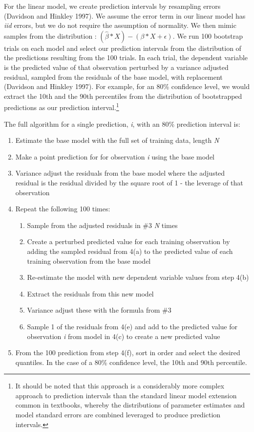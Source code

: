 \documentclass[colTwo]{anon}
\theoremstyle{definition}
\begin{document}
For the linear model, we create prediction intervals by resampling errors (Davidson and Hinkley 1997). We assume the error term in our linear model has \textit{iid} errors, but we do not require the assumption of normality. We then mimic samples from the distribution : \((\widehat{\beta}*X) - (\beta*X + \epsilon)\). We run 100 bootstrap trials on each model and select our prediction intervals from the distribution of the predictions resulting from the 100 trials. In each trial, the dependent variable is the predicted value of that observation perturbed by a variance adjusted residual, sampled from the residuals of the base model, with replacement (Davidson and Hinkley 1997).  For example, for an 80\% confidence level, we would extract the 10th and the 90th percentiles from the distribution of bootstrapped predictions as our prediction interval.\footnote{It should be noted that this approach is a considerably more complex approach to prediction intervals than the standard linear model extension common in textbooks, whereby the distributions of parameter estimates and model standard errors are combined leveraged to produce prediction intervals.}  

The full algorithm for a single prediction, \textit{i}, with an 80\% prediction interval is:
\begin{enumerate}
\item Estimate the base model with the full set of training data, length \textit{N}
\item Make a point prediction for for observation \textit{i} using the base model
\item Variance adjust the residuals from the base model where the adjusted residual is the residual divided by the square root of 1 - the leverage of that observation
\item Repeat the following 100 times:
\begin{enumerate}
\item Sample from the adjusted residuals in \#3 \textit{N} times
\item Create a perturbed predicted value for each training observation by adding the sampled residual from 4(a) to the predicted value of each training observation from the base model
\item Re-estimate the model with new dependent variable values from step 4(b)
\item Extract the residuals from this new model
\item Variance adjust these with the formula from \#3
\item Sample 1 of the residuals from 4(e) and add to the predicted value for observation \textit{i} from model in 4(c) to create a new predicted value
\end{enumerate}
\item From the 100 prediction from step 4(f), sort in order and select the desired quantiles.  In the case of a 80\% confidence level, the 10th and 90th percentile. 
\end{enumerate}
\end{document}
